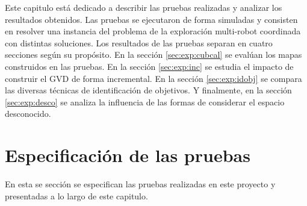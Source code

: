 






Este capitulo está dedicado a describir las pruebas realizadas y analizar los
resultados obtenidos. Las pruebas se ejecutaron de forma simuladas y consisten
en resolver una instancia del problema de la exploración multi-robot coordinada
con distintas soluciones.
Los resultados de las pruebas separan en cuatro secciones según su propósito.
En la sección \ref{sec:exp:cubcal} se evalúan los mapas construidos en las
pruebas. En la sección \ref{sec:exp:inc} se estudia el impacto de construir el
GVD de forma incremental. En la sección \ref{sec:exp:idobj} se compara las
diversas técnicas de identificación de objetivos. Y finalmente, en la sección
\ref{sec:exp:desco} se analiza la influencia de las formas de considerar el
espacio desconocido. 

\section{Especificación de las pruebas}

En esta se sección se especifican las pruebas realizadas en este
proyecto y presentadas a lo largo de este capitulo.

